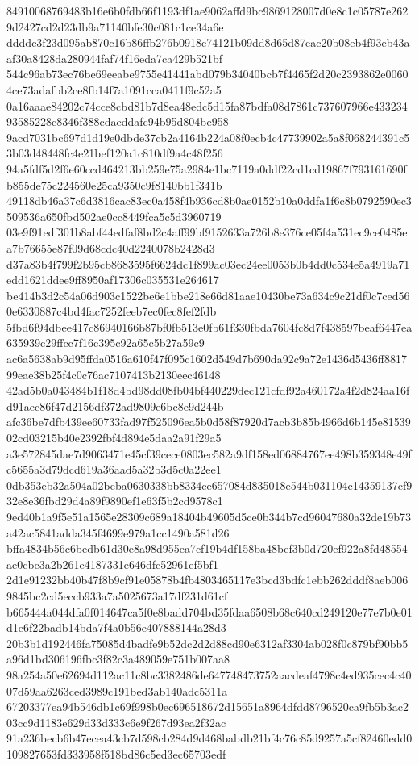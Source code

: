 \documentclass[11pt,a4paper]{article}
\begin{document}
{84910068769483b16e6b0fdb66f1193df1ae9062affd9bc9869128007d0e8c1c05787e2629d2427cd2d23db9a71140bfe30c081c1ce34a6e
ddddc3f23d095ab870c16b86ffb276b0918c74121b09dd8d65d87eac20b08eb4f93eb43aaf30a8428da280944faf74f16eda7ca429b521bf
544c96ab73ec76be69eeabe9755e41441abd079b34040bcb7f4465f2d20c2393862e00604ce73adafbb2ce8fb14f7a1091cca0411f9c52a5
0a16aaae84202c74cce8cbd81b7d8ea48edc5d15fa87bdfa08d7861c737607966e43323493585228c8346f388cdaeddafc94b95d804be958
9acd7031bc697d1d19e0dbde37cb2a4164b224a08f0ecb4c47739902a5a8f068244391c53b03d48448fc4e21bef120a1c810df9a4c48f256
94a5fdf5d2f6e60ccd464213bb259e75a2984e1bc7119a0ddf22cd1cd19867f793161690fb855de75c224560e25ca9350c9f8140bb1f341b
49118db46a37c6d3816cac83ec0a458f4b936cd8b0ae0152b10a0ddfa1f6c8b0792590ec3509536a650fbd502ae0cc8449fca5c5d3960719
03e9f91edf301b8abf44edfaf8bd2c4aff99bf9152633a726b8e376ce05f4a531ec9ce0485ea7b76655e87f09d68cdc40d2240078b2428d3
d37a83b4f799f2b95cb8683595f6624dc1f899ac03ec24ee0053b0b4dd0c534e5a4919a71edd1621ddee9ff8950af17306c035531e264617
be414b3d2c54a06d903c1522be6e1bbe218e66d81aae10430be73a634c9c21df0c7ced560e6330887c4bd4fac7252feeb7ec0fec8fef2fdb
5fbd6f94dbee417c86940166b87bf0fb513e0fb61f330fbda7604fc8d7f438597beaf6447ea635939c29ffcc7f16c395c92a65c5b27a59c9
ac6a5638ab9d95ffda0516a610f47f095c1602d549d7b690da92c9a72e1436d5436ff881799eae38b25f4c0c76ac7107413b2130eec46148
42ad5b0a043484b1f18d4bd98dd08fb04bf440229dec121cfdf92a460172a4f2d824aa16fd91aec86f47d2156df372ad9809e6bc8e9d244b
afc36be7dfb439ee60733fad97f525096ea5b0d58f87920d7acb3b85b4966d6b145e8153902cd03215b40e2392fbf4d894e5daa2a91f29a5
a3e572845dae7d9063471e45cf39cece0803ec582a9df158ed06884767ee498b359348e49fc5655a3d79dcd619a36aad5a32b3d5c0a22ee1
0db353eb32a504a02beba0630338bb8334ce657084d835018e544b031104c14359137cf932e8e36fbd29d4a89f9890ef1e63f5b2cd9578c1
9ed40b1a9f5e51a1565e28309c689a18404b49605d5ce0b344b7cd96047680a32de19b73a42ac5841adda345f4699e979a1cc1490a581d26
bffa4834b56c6bedb61d30e8a98d955ea7cf19b4df158ba48bef3b0d720ef922a8fd48554ae0cbc3a2b261e4187331e646dfc52961ef5bf1
2d1e91232bb40b47f8b9cf91e05878b4fb4803465117e3bcd3bdfc1ebb262dddf8aeb0069845bc2cd5eccb933a7a5025673a17df231d61cf
b665444a044dfa0f014647ca5f0e8badd704bd35fdaa6508b68c640cd249120e77e7b0e01d1e6f22badb14bda7f4a0b56e407888144a28d3
20b3b1d192446fa75085d4badfe9b52dc2d2d88cd90e6312af3304ab028f0c879bf90bb5a96d1bd306196fbc3f82c3a489059e751b007aa8
98a254a50e62694d112ac11c8bc3382486de647748473752aacdeaf4798c4ed935cec4c4007d59aa6263ced3989c191bed3ab140adc5311a
67203377ea94b546db1c69f998b0ec696518672d15651a8964dfdd8796520ca9fb5b3ac203cc9d1183e629d33d333c6e9f267d93ea2f32ac
91a236becb6b47ecea43cb7d598cb284d9d468babdb21bf4c76c85d9257a5cf82460edd0109827653fd333958f518bd86c5ed3ec65703edf
}
\end{document}
